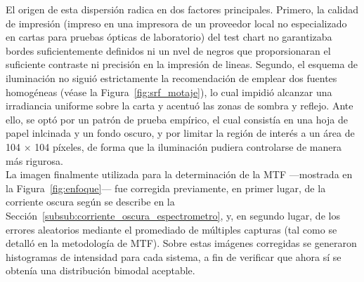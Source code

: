       El origen de esta dispersión radica en dos factores principales. Primero, la calidad de impresión (impreso en una impresora de un proveedor local no especializado en cartas para pruebas ópticas de laboratorio) del test chart no garantizaba bordes suficientemente definidos ni un nvel de negros que proporsionaran el suficiente contraste ni precisión en la impresión de lineas. Segundo, el esquema de iluminación no siguió estrictamente la recomendación de emplear dos fuentes homogéneas (véase la Figura~\ref{fig:srf_motaje}), lo cual impidió alcanzar una irradiancia uniforme sobre la carta y acentuó las zonas de sombra y reflejo. Ante ello, se optó por un patrón de prueba empírico, el cual consistía en una hoja de papel inlcinada y un fondo oscuro, y por limitar la región de interés a un área de 104 $\times$ 104 píxeles, de forma que la iluminación pudiera controlarse de manera más rigurosa.\\
      
      La imagen finalmente utilizada para la determinación de la MTF —mostrada en la Figura~\ref{fig:enfoque}— fue corregida previamente, en primer lugar, de la corriente oscura según se describe en la Sección~\ref{subsub:corriente_oscura_espectrometro}, y, en segundo lugar, de los errores aleatorios mediante el promediado de múltiples capturas (tal como se detalló en la metodología de MTF). Sobre estas imágenes corregidas se generaron histogramas de intensidad para cada sistema, a fin de verificar que ahora sí se obtenía una distribución bimodal aceptable.
      

